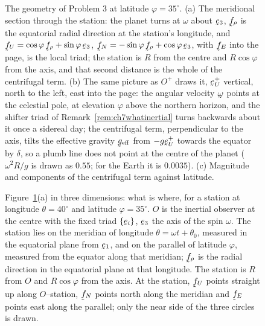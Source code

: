 \begin{figure}[htbp]\centering
\renewcommand{\thefigure}{J}

\caption{The geometry of Problem 3 at latitude $\varphi=35^{\circ}$.
(a) The meridional section through the station: the planet turns at
$\omega$ about $\be_{3}$, $\bff_{\rho}$ is the equatorial radial
direction at the station's longitude, and
$\bff_{U}=\cos\varphi\,\bff_{\rho}+\sin\varphi\,\be_{3}$,
$\bff_{N}=-\sin\varphi\,\bff_{\rho}+\cos\varphi\,\be_{3}$, with
$\bff_{E}$ into the page, is the local triad; the station is $R$
from the centre and $R\cos\varphi$ from the axis, and that second
distance is the whole of the centrifugal term. (b) The same picture as
$O^{+}$ draws it, $\be^{+}_{U}$ vertical, north to the left, east into
the page: the angular velocity $\bom$ points at the celestial pole, at elevation
$\varphi$ above the northern horizon, and the shifter triad of
Remark~\ref{rem:ch7whatinertial} turns backwards about it once a
sidereal day; the centrifugal term, perpendicular to the axis,
tilts the effective gravity $\bg_{\mathrm{eff}}$ from $-g\be^{+}_{U}$
towards the equator by $\delta$, so a plumb line does not point at the
centre of the planet ($\omega^{2}R/g$ is drawn as $0.55$; for the Earth
it is $0.0035$). (c) Magnitude and components of the centrifugal term
against latitude.}
\label{fig:ch7planet}
\end{figure}
\begin{figure}[htbp]\centering
\renewcommand{\thefigure}{K}

\caption{Figure~\ref{fig:ch7planet}(a) in three dimensions: what is
where, for a station at longitude $\theta=40^{\circ}$ and latitude
$\varphi=35^{\circ}$. $O$ is the inertial observer at the centre with
the fixed triad $\{\be_{i}\}$, $\be_{3}$ the axis of the spin $\omega$.
The station lies on the meridian of longitude $\theta=\omega t+\theta_{0}$,
measured in the equatorial plane from $\be_{1}$, and on the parallel of
latitude $\varphi$, measured from the equator along that meridian;
$\bff_{\rho}$ is the radial direction in the equatorial plane at that
longitude. The station is $R$ from $O$ and $R\cos\varphi$ from the axis.
At the station, $\bff_{U}$ points straight up along $O$--station,
$\bff_{N}$ points north along the meridian and $\bff_{E}$ points east
along the parallel; only the near side of the three circles is drawn.}
\label{fig:ch7planet3d}
\end{figure}
